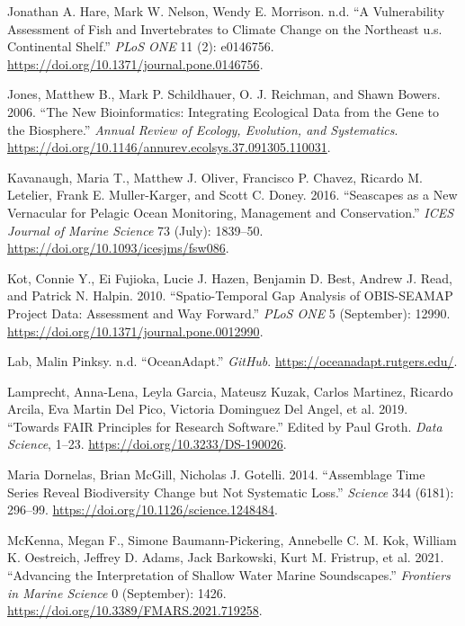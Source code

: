 \documentclass[
]{book}
\newlength{\cslhangindent}
\newlength{\cslentryspacingunit} %
\newenvironment{CSLReferences}[2] %
 {%
  \setlength{\parindent}{0pt}
  \ifodd #1
  \let\oldpar\par
  \def\par{\hangindent=\cslhangindent\oldpar}
  \fi
  \setlength{\parskip}{#2\cslentryspacingunit}
 }%
 {}
\begin{document}
\begin{CSLReferences}{1}{0}
\leavevmode{}%
Jonathan A. Hare, Mark W. Nelson, Wendy E. Morrison. n.d. {``A Vulnerability Assessment of Fish and Invertebrates to Climate Change on the Northeast u.s. Continental Shelf.''} \emph{PLoS ONE} 11 (2): e0146756. \url{https://doi.org/10.1371/journal.pone.0146756}.

\leavevmode{}%
Jones, Matthew B., Mark P. Schildhauer, O. J. Reichman, and Shawn Bowers. 2006. {``The New Bioinformatics: Integrating Ecological Data from the Gene to the Biosphere.''} \emph{Annual Review of Ecology, Evolution, and Systematics}. \url{https://doi.org/10.1146/annurev.ecolsys.37.091305.110031}.

\leavevmode{}%
Kavanaugh, Maria T., Matthew J. Oliver, Francisco P. Chavez, Ricardo M. Letelier, Frank E. Muller-Karger, and Scott C. Doney. 2016. {``Seascapes as a New Vernacular for Pelagic Ocean Monitoring, Management and Conservation.''} \emph{ICES Journal of Marine Science} 73 (July): 1839--50. \url{https://doi.org/10.1093/icesjms/fsw086}.

\leavevmode{}%
Kot, Connie Y., Ei Fujioka, Lucie J. Hazen, Benjamin D. Best, Andrew J. Read, and Patrick N. Halpin. 2010. {``Spatio-Temporal Gap Analysis of OBIS-SEAMAP Project Data: Assessment and Way Forward.''} \emph{PLoS ONE} 5 (September): 12990. \url{https://doi.org/10.1371/journal.pone.0012990}.

\leavevmode{}%
Lab, Malin Pinksy. n.d. {``OceanAdapt.''} \emph{GitHub}. \url{https://oceanadapt.rutgers.edu/}.

\leavevmode{}%
Lamprecht, Anna-Lena, Leyla Garcia, Mateusz Kuzak, Carlos Martinez, Ricardo Arcila, Eva Martin Del Pico, Victoria Dominguez Del Angel, et al. 2019. {``Towards FAIR Principles for Research Software.''} Edited by Paul Groth. \emph{Data Science}, 1--23. \url{https://doi.org/10.3233/DS-190026}.

\leavevmode{}%
Maria Dornelas, Brian McGill, Nicholas J. Gotelli. 2014. {``Assemblage Time Series Reveal Biodiversity Change but Not Systematic Loss.''} \emph{Science} 344 (6181): 296--99. \url{https://doi.org/10.1126/science.1248484}.

\leavevmode{}%
McKenna, Megan F., Simone Baumann-Pickering, Annebelle C. M. Kok, William K. Oestreich, Jeffrey D. Adams, Jack Barkowski, Kurt M. Fristrup, et al. 2021. {``Advancing the Interpretation of Shallow Water Marine Soundscapes.''} \emph{Frontiers in Marine Science} 0 (September): 1426. \url{https://doi.org/10.3389/FMARS.2021.719258}.


\end{CSLReferences}
\end{document}

